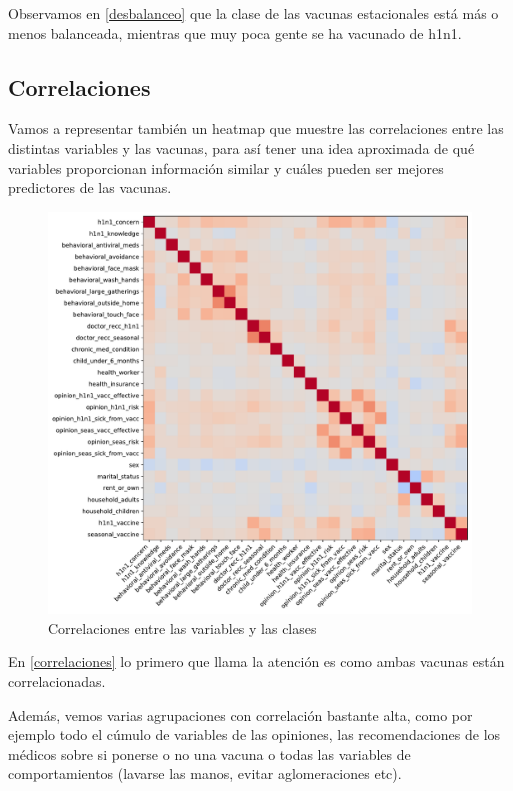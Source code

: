 \documentclass[twoside,openright,titlepage,numbers=noenddot,openany,headinclude,footinclude=true,
cleardoublepage=empty,abstractoff,BCOR=5mm,paper=a4,fontsize=12pt,main=spanish]{scrreprt}
\begin{document}
Observamos en \eqref{desbalanceo} que la clase de las vacunas estacionales está más o menos balanceada, mientras que muy poca gente se ha vacunado de h1n1.

\subsection{Correlaciones}

Vamos a representar también un heatmap que muestre las correlaciones entre las distintas variables y las vacunas, para así tener una idea aproximada de qué variables proporcionan información similar y cuáles pueden ser mejores predictores de las vacunas.

\begin{figure}[H]
\includegraphics[scale=0.5]{correlaciones.pdf}
\caption{Correlaciones entre las variables y las clases}
\label{correlaciones}
\end{figure}

En \eqref{correlaciones} lo primero que llama la atención es como ambas vacunas están correlacionadas.

Además, vemos varias agrupaciones con correlación bastante alta, como por ejemplo todo el cúmulo de variables de las opiniones, las recomendaciones de los médicos sobre si ponerse o no una vacuna o todas las variables de comportamientos (lavarse las manos, evitar aglomeraciones etc).
\end{document}
